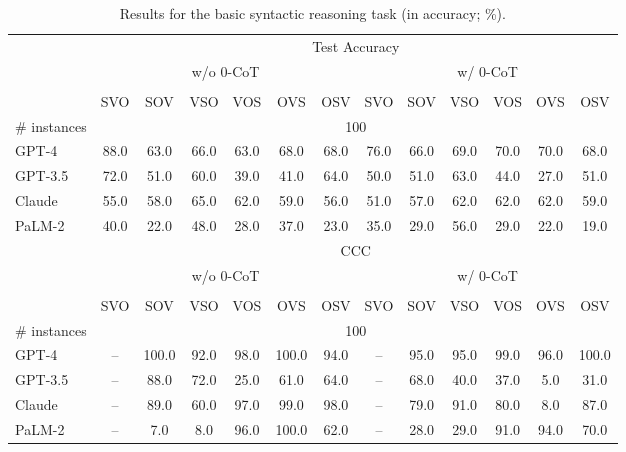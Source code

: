 \begin{table}[t!]
    \centering
    \footnotesize
    \begin{tabular}{lcccccccccccc}
    \toprule 
     & \multicolumn{12}{c}{Test Accuracy} \\ \cmidrule(lr){2-13}
     & \multicolumn{6}{c}{w/o 0-CoT} & \multicolumn{6}{c}{w/ 0-CoT} \\
     \cmidrule(lr){2-7} \cmidrule(lr){8-13} \\
      & SVO & SOV & VSO & VOS & OVS & OSV  & SVO & SOV & VSO & VOS & OVS & OSV \\
     \midrule
     \# instances & \multicolumn{12}{c}{100} \\
    \midrule
    GPT-4 & 88.0 & 63.0 & 66.0 & 63.0 & 68.0 & 68.0 & 76.0 & 66.0 & 69.0 & 70.0 & 70.0 & 68.0 \\
    GPT-3.5 & 72.0 & 51.0 & 60.0 & 39.0 & 41.0 & 64.0 & 50.0 & 51.0 & 63.0 & 44.0 & 27.0 & 51.0 \\
    Claude & 55.0 & 58.0 & 65.0 & 62.0 & 59.0 & 56.0 & 51.0 & 57.0 & 62.0 & 62.0 & 62.0 & 59.0 \\
    PaLM-2 &  40.0 & 22.0 &  48.0 & 28.0 & 37.0 & 23.0 & 35.0 & 29.0 & 56.0 & 29.0 & 22.0 & 19.0 \\
    \midrule
     & \multicolumn{12}{c}{CCC} \\ \cmidrule(lr){2-13} & \multicolumn{6}{c}{w/o 0-CoT} & \multicolumn{6}{c}{w/ 0-CoT} \\
     \cmidrule(lr){2-7} \cmidrule(lr){8-13} \\
      & SVO & SOV & VSO & VOS & OVS & OSV  & SVO & SOV & VSO & VOS & OVS & OSV \\
     \midrule
     \# instances & \multicolumn{12}{c}{100} \\
    \midrule
    GPT-4 & -- & 100.0 & 92.0 & 98.0 & 100.0 & 94.0 & -- & 95.0 & 95.0 & 99.0 & 96.0 & 100.0 \\
    GPT-3.5 & -- & \phantom{0}88.0 & 72.0 & 25.0 & \phantom{0}61.0 & 64.0 & -- & 68.0 & 40.0 & 37.0 & \phantom{0}5.0 & \phantom{0}31.0 \\
    Claude & -- & \phantom{0}89.0 & 60.0 & 97.0 & \phantom{0}99.0 & 98.0 & -- & 79.0 & 91.0 & 80.0 & \phantom{0}8.0 & \phantom{0}87.0 \\
    PaLM-2 & -- & \phantom{00}7.0 & \phantom{0}8.0  & 96.0 & 100.0 & 62.0 & -- & 28.0 & 29.0 &91.0 & 94.0 & \phantom{0}70.0    \\
    \bottomrule
    \end{tabular}
    \caption{Results for the basic syntactic reasoning task (in accuracy; \%).
    }
    \label{tab:word_order_raw}
\end{table}
